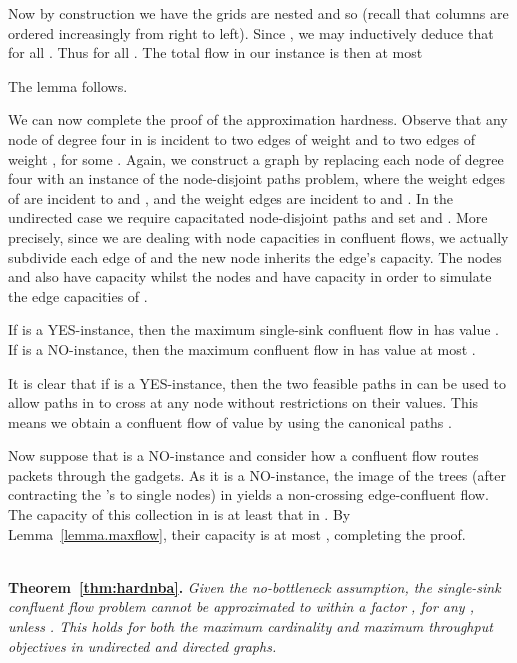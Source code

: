 \documentclass[12pt]{article}
\newcommand{\qed}{}
\begin{document}
Now by construction we have the grids are nested and so
(recall that columns are ordered increasingly from
right to left). Since , we may inductively deduce that
 for all . Thus  for all .
The total flow in our instance is then at most

The lemma follows.
\qed








We can now complete the proof of the approximation hardness. Observe that any
node of degree four in  is incident to two edges of weight
 and to two edges of weight , for some . Again, we
construct a graph  by replacing each node of degree four with
an instance  of the  node-disjoint paths problem,
where the weight 
edges of  are incident to  and , and the weight 
edges are incident to  and .
In the undirected case we require capacitated node-disjoint paths
and set  and .
More precisely, since we are dealing with node capacities in confluent flows,
we actually subdivide each edge of  and the new node
inherits the edge's capacity.
The nodes  and  also have capacity  whilst the nodes
 and  have capacity  in order to simulate the edge capacities of .




\begin{lemma}\label{lem:yes2}
If  is a YES-instance, then the maximum single-sink confluent flow in
 has value .  If  is a NO-instance, then the maximum
confluent flow in  has value at most .
\end{lemma}
  It is clear that if  is a YES-instance, then the two feasible paths
in  can be used to allow paths in  to cross at any node
without restrictions on their values. This means we obtain a confluent flow of value
 by using the canonical paths .

Now  suppose that  is a NO-instance and
consider how a confluent
flow  routes packets through the gadgets.
As it is a NO-instance,
the image of the  trees (after contracting the 's to single nodes) in  yields a non-crossing edge-confluent flow.
The capacity of this collection in  is at least that in .
By Lemma~\ref{lemma.maxflow}, their capacity is at most , completing the proof.
\qed

\ \\
{{\noindent\bf Theorem~\ref{thm:hardnba}.} \itshape
Given the no-bottleneck assumption, the single-sink confluent flow problem
cannot be approximated to within a factor , for any , unless .
This holds for both the maximum cardinality and maximum throughput objectives
in undirected and directed graphs.\\
}
\end{document}
